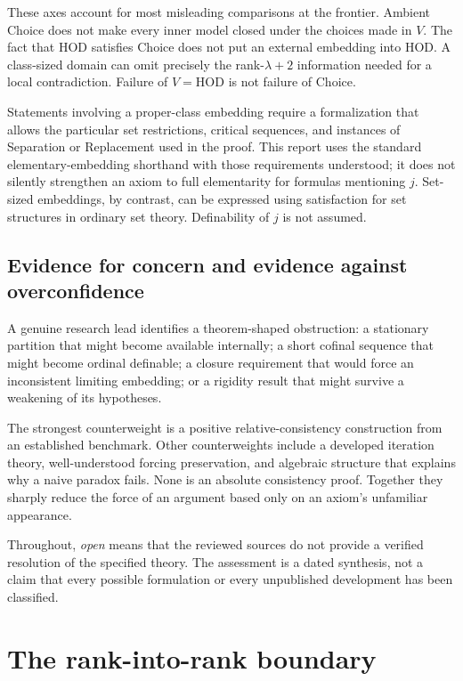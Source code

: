 \documentclass[11pt,letterpaper]{article}
\theoremstyle{definition}
\newcommand{\HOD}{\mathrm{HOD}}
\begin{document}
These axes account for most misleading comparisons at the frontier. Ambient Choice does not make every inner model closed under the choices made in $V$. The fact that HOD satisfies Choice does not put an external embedding into HOD. A class-sized domain can omit precisely the rank-$\lambda+2$ information needed for a local contradiction. Failure of $V=\HOD$ is not failure of Choice.

Statements involving a proper-class embedding require a formalization that allows the particular set restrictions, critical sequences, and instances of Separation or Replacement used in the proof. This report uses the standard elementary-embedding shorthand with those requirements understood; it does not silently strengthen an axiom to full elementarity for formulas mentioning $j$. Set-sized embeddings, by contrast, can be expressed using satisfaction for set structures in ordinary set theory. Definability of $j$ is not assumed. \cite{hkp,wholeness}

\subsection{Evidence for concern and evidence against overconfidence}

A genuine research lead identifies a theorem-shaped obstruction: a stationary partition that might become available internally; a short cofinal sequence that might become ordinal definable; a closure requirement that would force an inconsistent limiting embedding; or a rigidity result that might survive a weakening of its hypotheses.

The strongest counterweight is a positive relative-consistency construction from an established benchmark. Other counterweights include a developed iteration theory, well-understood forcing preservation, and algebraic structure that explains why a naive paradox fails. None is an absolute consistency proof. Together they sharply reduce the force of an argument based only on an axiom's unfamiliar appearance. \cite{dimonte,iterability,abgl,dimwu}

Throughout, \emph{open} means that the reviewed sources do not provide a verified resolution of the specified theory. The assessment is a dated synthesis, not a claim that every possible formulation or every unpublished development has been classified.

\section{The rank-into-rank boundary}\label{sec:rank}
\end{document}
